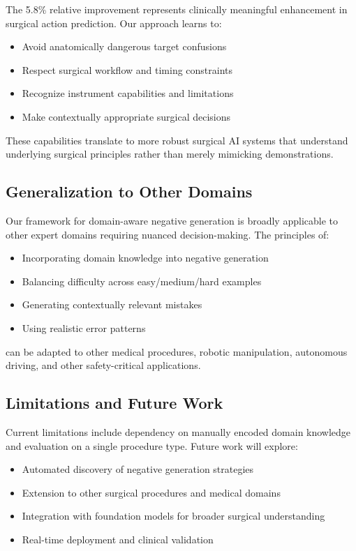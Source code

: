 \documentclass[runningheads]{llncs}
\begin{document}
The 5.8\% relative improvement represents clinically meaningful enhancement in surgical action prediction. Our approach learns to:
\begin{itemize}
\item Avoid anatomically dangerous target confusions
\item Respect surgical workflow and timing constraints  
\item Recognize instrument capabilities and limitations
\item Make contextually appropriate surgical decisions
\end{itemize}

These capabilities translate to more robust surgical AI systems that understand underlying surgical principles rather than merely mimicking demonstrations.

\subsection{Generalization to Other Domains}

Our framework for domain-aware negative generation is broadly applicable to other expert domains requiring nuanced decision-making. The principles of:
\begin{itemize}
\item Incorporating domain knowledge into negative generation
\item Balancing difficulty across easy/medium/hard examples
\item Generating contextually relevant mistakes
\item Using realistic error patterns
\end{itemize}

can be adapted to other medical procedures, robotic manipulation, autonomous driving, and other safety-critical applications.

\subsection{Limitations and Future Work}

Current limitations include dependency on manually encoded domain knowledge and evaluation on a single procedure type. Future work will explore:
\begin{itemize}
\item Automated discovery of negative generation strategies
\item Extension to other surgical procedures and medical domains
\item Integration with foundation models for broader surgical understanding
\item Real-time deployment and clinical validation
\end{itemize}
\end{document}
